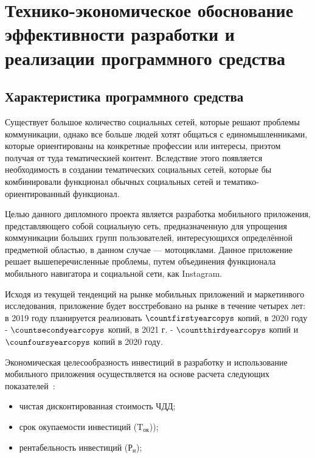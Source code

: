 


\section{Технико-экономическое обоснование эффективности разработки и реализации программного средства}
\label{sec:economics}

\subsection{Характеристика программного средства}
\label{sec:economics:description}

Существует большое количество социальных сетей, которые решают проблемы коммуникации, однако все больше людей хотят общаться с единомышленниками, которые ориентированы на конкретные профессии или интересы, приэтом получая от туда тематическией контент.
Вследствие этого появляется необходимость в создании тематических социальных сетей, которые бы комбинировали функционал обычных социальных сетей и тематико-ориентированный функционал.

Целью данного дипломного проекта является разработка мобильного приложения, представляющего собой социальную сеть, предназначенную для упрощения коммуникации больших групп пользователей, интересующихся определённой предметной областью, в данном случае --- мотоциклами.
Данное приложение решает вышеперечисленные проблемы, путем объединения функционала мобильного навигатора и социальной сети, как Instagram.

Исходя из текущей тенденций на рынке мобильных приложений и маркетинвого исследования, приложение будет восстребовано на рынке в течение четырех лет:
в 2019 году планируется реализовать $ \countfirstyearcopys $ копий, в 2020 году - $ \countsecondyearcopys $ копий, в 2021 г. - $ \countthirdyearcopys $ копий и $ \counfoursyearcopys $ копий в 2020 году.

Экономическая целесообразность инвестиций в разработку и использование мобильного приложения осуществляется на основе расчета следующих показателей~\cite{nosenko}:
\begin{itemize}
	\item чистая дисконтированная стоимость ЧДД;
	\item срок окупаемости инвестиций ($ \text{T}_\text{ок} $));
	\item рентабельность инвестиций ($ \text{Р}_\text{н} $);
\end{itemize}

